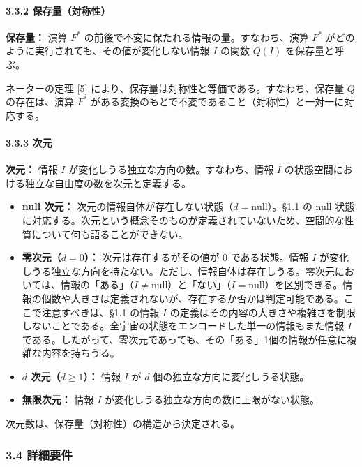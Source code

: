 \documentclass[a4paper,11pt]{ltjsarticle}
\providecommand{\tightlist}{\setlength{\itemsep}{0pt}\setlength{\parskip}{0pt}}
\begin{document}
\paragraph{3.3.2
保存量（対称性）}\label{ux4fddux5b58ux91cfux5bfeux79f0ux6027}

\textbf{保存量：} 演算 \(F^*\)
の前後で不変に保たれる情報の量。すなわち、演算 \(F^*\)
がどのように実行されても、その値が変化しない情報 \(I\) の関数 \(Q(I)\)
を保存量と呼ぶ。

ネーターの定理 {[}5{]}
により、保存量は対称性と等価である。すなわち、保存量 \(Q\)
の存在は、演算 \(F^*\)
がある変換のもとで不変であること（対称性）と一対一に対応する。

\paragraph{3.3.3 次元}\label{ux6b21ux5143}

\textbf{次元：} 情報 \(I\) が変化しうる独立な方向の数。すなわち、情報
\(I\) の状態空間における独立な自由度の数を次元と定義する。

\begin{itemize}
\tightlist
\item
  \textbf{null 次元：}
  次元の情報自体が存在しない状態（\(d = \mathrm{null}\)）。§1.1 の null
  状態に対応する。次元という概念そのものが定義されていないため、空間的な性質について何も語ることができない。
\item
  \textbf{零次元（\(d = 0\)）：} 次元は存在するがその値が 0
  である状態。情報 \(I\)
  が変化しうる独立な方向を持たない。ただし、情報自体は存在しうる。零次元においては、情報の「ある」（\(I \neq \mathrm{null}\)）と「ない」（\(I = \mathrm{null}\)）を区別できる。情報の個数や大きさは定義されないが、存在するか否かは判定可能である。ここで注意すべきは、§1.1
  の情報 \(I\)
  の定義はその内容の大きさや複雑さを制限しないことである。全宇宙の状態をエンコードした単一の情報もまた情報
  \(I\)
  である。したがって、零次元であっても、その「ある」1個の情報が任意に複雑な内容を持ちうる。
\item
  \textbf{\(d\) 次元（\(d \geq 1\)）：} 情報 \(I\) が \(d\)
  個の独立な方向に変化しうる状態。
\item
  \textbf{無限次元：} 情報 \(I\)
  が変化しうる独立な方向の数に上限がない状態。
\end{itemize}

次元数は、保存量（対称性）の構造から決定される。

\subsubsection{3.4 詳細要件}\label{ux8a73ux7d30ux8981ux4ef6}
\end{document}
